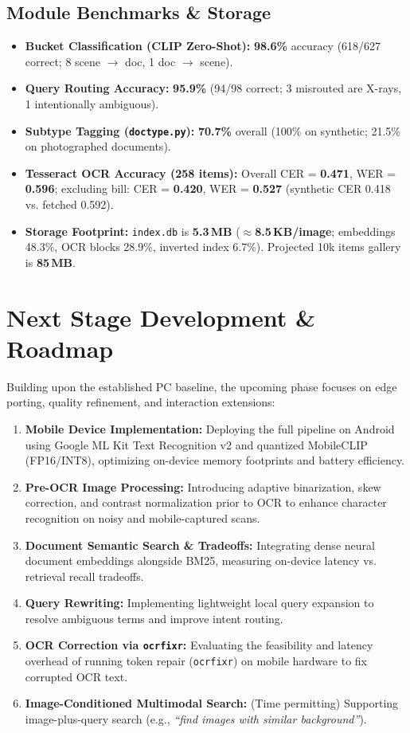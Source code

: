 \documentclass[10.5pt,twocolumn]{article}
\begin{document}
\subsection{Module Benchmarks \& Storage}
\begin{itemize}
    \item \textbf{Bucket Classification (CLIP Zero-Shot):} \textbf{98.6\%} accuracy (618/627 correct; 8 scene $\rightarrow$ doc, 1 doc $\rightarrow$ scene).
    \item \textbf{Query Routing Accuracy:} \textbf{95.9\%} (94/98 correct; 3 misrouted are X-rays, 1 intentionally ambiguous).
    \item \textbf{Subtype Tagging (\texttt{doctype.py}):} \textbf{70.7\%} overall (100\% on synthetic; 21.5\% on photographed documents).
    \item \textbf{Tesseract OCR Accuracy (258 items):} Overall CER = \textbf{0.471}, WER = \textbf{0.596}; excluding bill: CER = \textbf{0.420}, WER = \textbf{0.527} (synthetic CER 0.418 vs. fetched 0.592).
    \item \textbf{Storage Footprint:} \texttt{index.db} is \textbf{5.3\,MB} ($\approx$\textbf{8.5\,KB/image}; embeddings 48.3\%, OCR blocks 28.9\%, inverted index 6.7\%). Projected 10k items gallery is \textbf{85\,MB}.
\end{itemize}

\section{Next Stage Development \& Roadmap}
Building upon the established PC baseline, the upcoming phase focuses on edge porting, quality refinement, and interaction extensions:
\begin{enumerate}
    \item \textbf{Mobile Device Implementation:} Deploying the full pipeline on Android using Google ML Kit Text Recognition v2 and quantized MobileCLIP (FP16/INT8), optimizing on-device memory footprints and battery efficiency.
    \item \textbf{Pre-OCR Image Processing:} Introducing adaptive binarization, skew correction, and contrast normalization prior to OCR to enhance character recognition on noisy and mobile-captured scans.
    \item \textbf{Document Semantic Search \& Tradeoffs:} Integrating dense neural document embeddings alongside BM25, measuring on-device latency vs. retrieval recall tradeoffs.
    \item \textbf{Query Rewriting:} Implementing lightweight local query expansion to resolve ambiguous terms and improve intent routing.
    \item \textbf{OCR Correction via \texttt{ocrfixr}:} Evaluating the feasibility and latency overhead of running token repair (\texttt{ocrfixr}) on mobile hardware to fix corrupted OCR text.
    \item \textbf{Image-Conditioned Multimodal Search:} (Time permitting) Supporting image-plus-query search (e.g., \textit{``find images with similar background''}).
\end{enumerate}
\end{document}
